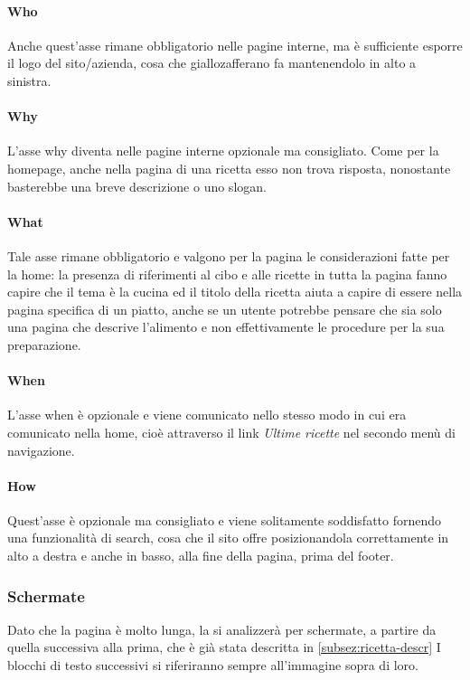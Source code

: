 \paragraph{Who} 
 Anche quest'asse rimane obbligatorio nelle pagine interne, ma è sufficiente esporre il logo del sito/azienda, cosa che giallozafferano fa mantenendolo in alto a sinistra.
 
\paragraph{Why} 
L'asse why diventa nelle pagine interne opzionale ma consigliato. Come per la homepage, anche nella pagina di una ricetta esso non trova risposta, nonostante basterebbe una breve descrizione o uno slogan.

\paragraph{What} 
Tale asse rimane obbligatorio e valgono per la pagina le considerazioni fatte per la home: la presenza di riferimenti al cibo e alle ricette in tutta la pagina fanno capire che il tema è la cucina ed il titolo della ricetta aiuta a capire di essere nella pagina specifica di un piatto, anche se un utente potrebbe pensare che sia solo una pagina che descrive l'alimento e non effettivamente le procedure per la sua preparazione.

\paragraph{When}
L'asse when è opzionale e viene comunicato nello stesso modo in cui era comunicato nella home, cioè attraverso il link \textit{Ultime ricette} nel secondo menù di navigazione. 

\paragraph{How} 
Quest'asse è opzionale ma consigliato e viene solitamente soddisfatto fornendo una funzionalità di search, cosa che il sito offre posizionandola correttamente in alto a destra e anche in basso, alla fine della pagina, prima del footer.
\clearpage

\subsubsection{Schermate}
Dato che la pagina è molto lunga, la si analizzerà per schermate, a partire da quella successiva alla prima, che è già stata descritta in \ref{subsez:ricetta-descr} I blocchi di testo successivi si riferiranno sempre all'immagine sopra di loro. 


